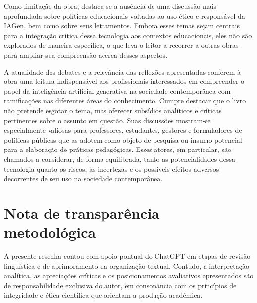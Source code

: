 \documentclass[portuguese]{textolivre}
\begin{document}
Como limitação da obra, destaca-se a ausência de uma discussão mais aprofundada sobre políticas educacionais voltadas ao uso ético e responsável da IAGen, bem como sobre seus letramentos. Embora esses temas sejam centrais para a integração crítica dessa tecnologia aos contextos educacionais, eles não são explorados de maneira específica, o que leva o leitor a recorrer a outras obras para ampliar sua compreensão acerca desses aspectos.

A atualidade dos debates e a relevância das reflexões apresentadas conferem à obra uma leitura indispensável aos profissionais interessados em compreender o papel da inteligência artificial generativa na sociedade contemporânea com ramificações nas diferentes áreas do conhecimento. Cumpre destacar que o livro não pretende esgotar o tema, mas oferecer subsídios analíticos e críticas pertinentes sobre o assunto em questão. Suas discussões mostram-se especialmente valiosas para professores, estudantes, gestores e formuladores de políticas públicas que as adotem como objeto de pesquisa ou insumo potencial para a elaboração de práticas pedagógicas. Esses atores, em particular, são chamados a considerar, de forma equilibrada, tanto as potencialidades dessa tecnologia quanto os riscos, as incertezas e os possíveis efeitos adversos decorrentes de seu uso na sociedade contemporânea.




\printbibliography\label{sec-bib}

\section*{\fontsize{10}{12}\selectfont Nota de transparência metodológica}
A presente resenha contou com apoio pontual do ChatGPT em etapas de revisão linguística e de aprimoramento da organização textual. Contudo, a  interpretação analítica, as apreciações críticas e os posicionamentos avaliativos apresentados são de responsabilidade exclusiva do autor, em consonância com os princípios de integridade e ética científica que orientam a produção acadêmica.

\begin{dataavailability}
\end{dataavailability}
\end{document}
